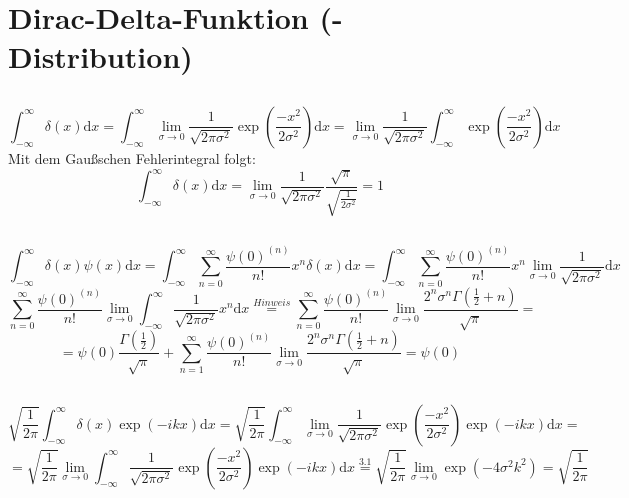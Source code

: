 \documentclass[a4paper,11pt]{article}
\begin{document}
\section{Dirac-Delta-Funktion (-Distribution)}

\subsection{}
\begin{equation}
        \int_{-\infty}^\infty \delta(x) \text{d}x = \int_{-\infty}^\infty \lim_{\sigma \to 0}\frac{1}{\sqrt{2\pi\sigma^2}}\exp(\frac{-x^2}{2\sigma^2})\text{d}x = \lim_{\sigma \to 0}\frac{1}{\sqrt{2\pi\sigma^2}} \int_{-\infty}^\infty \exp(\frac{-x^2}{2\sigma^2})\text{d}x
\end{equation}
Mit dem Gaußschen Fehlerintegral folgt:
\begin{equation}
        \int_{-\infty}^\infty \delta(x) \text{d}x = \lim_{\sigma \to 0}\frac{1}{\sqrt{2\pi\sigma^2}} \frac{\sqrt{\pi}}{\sqrt{\frac{1}{2\sigma^2}}} = 1
\end{equation}
\subsection{}
\begin{equation}
        \int_{-\infty}^\infty \delta(x) \psi(x)\text{d}x = \int_{-\infty}^\infty \sum_{n=0}^\infty \frac{\psi(0)^{(n)}}{n!} x^n \delta(x)\text{d}x = \int_{-\infty}^\infty \sum_{n=0}^\infty \frac{\psi(0)^{(n)}}{n!} x^n \lim_{\sigma \to 0}\frac{1}{\sqrt{2\pi\sigma^2}}\text{d}x
\end{equation}
\begin{equation}
        \sum_{n=0}^\infty \frac{\psi(0)^{(n)}}{n!} \lim_{\sigma \to 0} \int_{-\infty}^\infty \frac{1}{\sqrt{2\pi\sigma^2}} x^n \text{d}x \overset{Hinweis}{=} \sum_{n=0}^\infty \frac{\psi(0)^{(n)}}{n!} \lim_{\sigma \to 0} \frac{2^n\sigma^n\Gamma(\frac{1}{2} + n)}{\sqrt{\pi}} = 
\end{equation}
\begin{equation}
        = \psi(0) \frac{\Gamma(\frac{1}{2})}{\sqrt{\pi}} + \sum_{n=1}^\infty \frac{\psi(0)^{(n)}}{n!} \lim_{\sigma \to 0} \frac{2^n\sigma^n\Gamma(\frac{1}{2} + n)}{\sqrt{\pi}} = \psi(0)
\end{equation}
\subsection{}
\begin{equation}
        \sqrt{\frac{1}{2\pi}}\int_{-\infty}^\infty \delta(x) \exp(-ikx)\text{d}x = \sqrt{\frac{1}{2\pi}}\int_{-\infty}^\infty \lim_{\sigma \to 0}\frac{1}{\sqrt{2\pi\sigma^2}}\exp(\frac{-x^2}{2\sigma^2}) \exp(-ikx)\text{d}x = 
\end{equation}
\begin{equation}
        = \sqrt{\frac{1}{2\pi}}\lim_{\sigma \to 0}\int_{-\infty}^\infty \frac{1}{\sqrt{2\pi\sigma^2}}\exp(\frac{-x^2}{2\sigma^2}) \exp(-ikx)\text{d}x \overset{3.1}{=} \sqrt{\frac{1}{2\pi}}\lim_{\sigma \to 0} \exp(-4\sigma^2k^2) = \sqrt{\frac{1}{2\pi}}
\end{equation}
\end{document}
